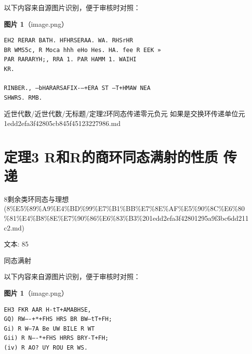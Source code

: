 \begin{note}
以下内容来自源图片识别，便于审核时对照：

\textbf{图片 1}（image.png）
\begin{Verbatim}[fontsize=\small]
EH2 RERAR BATH. HFHRSERAA. WA. RHSrHR
BR WMS5c, R Moca hhh eHo Hes. HA. fee R EEK »
PAR RARARYH;, RRA 1. PAR HAMM 1. WAIHI
KR.

RINBER., —bHARARSAFIX-—+ERA ST —T+HMAW NEA
SHWRS. RMB.
\end{Verbatim}

\end{note}

\begin{note}[来源路径]

近世代数/近世代数/无标题/定理2环同态传递零元负元 如果是交换环传递单位元 1edd2efa3f42805cb845f45123227986.md

\end{note}

\section*{定理3 R和R的商环同态满射的性质 传递}

\begin{note}[来源上级主题]

8剩余类环同态与理想 (8\%E5\%89\%A9\%E4\%BD\%99\%E7\%B1\%BB\%E7\%8E\%AF\%E5\%90\%8C\%E6\%80\%81\%E4\%B8\%8E\%E7\%90\%86\%E6\%83\%B3\%201edd2efa3f42801295a9f3bc6dd211c2.md)

\end{note}

\begin{theorem}[定理3 R和R的商环同态满射的性质 传递]

文本: 85

同态满射

\end{theorem}

\begin{note}
以下内容来自源图片识别，便于审核时对照：

\textbf{图片 1}（image.png）
\begin{Verbatim}[fontsize=\small]
EH3 FKR AAR H-tT+AMABHSE,
GQ) RW—-+*+FHS HRS BR BW—tT+FH;
Gi) R W—7A Be UW BILE R WT
Gii) R N—-*+FHS HRRS BRY-T+FH;
(iv) R AO? UY ROU ER WS.
\end{Verbatim}

\end{note}

